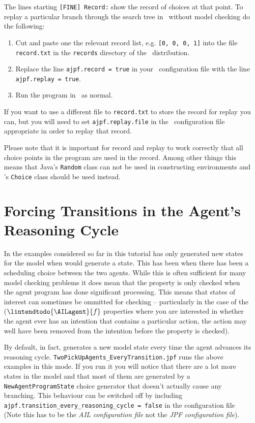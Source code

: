 \documentclass[a4]{article}
\begin{document}
The lines starting \texttt{[FINE] Record:} show the record of choices at that point.  To replay a particular branch through the search tree in \ail\ without model checking do the following:
\begin{enumerate}
\item Cut and paste one the relevant record list, e.g. \texttt{[0, 0, 0, 1]} into the file \texttt{record.txt} in the \texttt{records} directory of the \mcapl\ distribution.
\item Replace the line \texttt{ajpf.record = true} in your \ail\ configuration file with the line \texttt{ajpf.replay = true}.  
\item Run the program in \ail\ as normal.
\end{enumerate}

If you want to use a different file to \texttt{record.txt} to store the record for replay you can, but you will need to set \texttt{ajpf.replay.file} in the \ail\ configuration file appropriate in order to replay that record.

Please note that it is important for record and replay to work correctly that all choice points in the program are used in the record.  Among other things this means that Java's \texttt{Random} class can not be used in constructing environments and \ajpf's \texttt{Choice} class should be used instead.  

\section{Forcing Transitions in the Agent's Reasoning Cycle}
In the examples considered so far in this tutorial \ajpf{} has only generated new states for the model when \jpf{} would generate a state.  This has been when there has been a scheduling choice between the two agents.  While this is often sufficient for many model checking problems it does mean that the property is only checked when the agent program has done significant processing.  This means that states of interest can sometimes be ommitted for checking -- particularly in the case of the ($\lintendtodo{\AILagent}{f}$ properties where you are interested in whether the agent ever has an intention that contains a particular action, the action may well have been removed from the intention before the property is checked).

\begin{sloppypar}
By default, in fact, \ajpf{} generates a new model state every time the agent advances its reasoning cycle.  \texttt{TwoPickUpAgents\_EveryTransition.jpf} runs the above examples in this mode.  If you run it you will notice that there are a lot more states in the model and that most of them are generated by a \texttt{NewAgentProgramState} choice generator that doesn't actually cause any branching.  This behaviour can be switched off by including \texttt{ajpf.transition\_every\_reasoning\_cycle = false} in the \ail{} configuration file (Note this has to be the \emph{AIL configuration file} not the \emph{JPF configuration file}).
\end{sloppypar}



\end{document}
